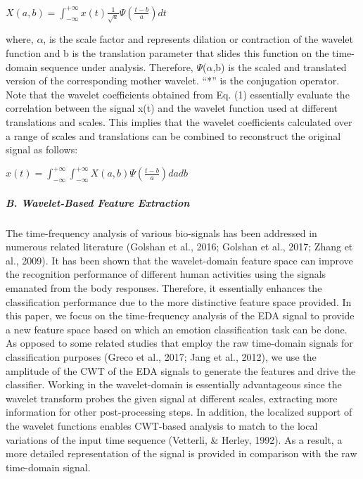 $X(a,b) = \int_{-\infty}^{+\infty}x(t)\frac{1}{\sqrt{a}} \Psi (\frac{t-b}{a}) dt$\newline

where, $\alpha$, is the scale factor and represents dilation or contraction of the wavelet 
function and b is the translation parameter that slides this function on the 
time-domain sequence under analysis. Therefore, $\Psi$($\alpha$,b) is the scaled and translated 
version of the corresponding mother wavelet. “*” is the conjugation operator.
Note that the wavelet coefficients obtained from Eq. (1) essentially evaluate the 
correlation between the signal x(t) and the wavelet function used at different 
translations and scales. This implies that the wavelet coefficients calculated 
over a range of scales and translations can be combined to reconstruct the original 
signal as follows:

$x(t) = \int_{-\infty}^{+\infty} \int_{-\infty}^{+\infty} X(a,b) \Psi (\frac{t-b}{a}) dadb$\newline

\subparagraph{B. Wavelet-Based Feature Extraction}
The time-frequency analysis of various bio-signals has been addressed in numerous 
related literature (Golshan et al., 2016; Golshan et al., 2017; Zhang et al., 2009). 
It has been shown that the wavelet-domain feature space can improve the recognition 
performance of different human activities using the signals emanated from the body 
responses. Therefore, it essentially enhances the classification performance due to 
the more distinctive feature space provided. 
In this paper, we focus on the time-frequency analysis of the EDA signal to provide 
a new feature space based on which an emotion classification task can be done. As 
opposed to some related studies that employ the raw time-domain signals for 
classification purposes (Greco et al., 2017; Jang et al., 2012), we use the 
amplitude of the CWT of the EDA signals to generate the features and drive the 
classifier. Working in the wavelet-domain is essentially advantageous since the 
wavelet transform probes the given signal at different scales, extracting more 
information for other post-processing steps. In addition, the localized support 
of the wavelet functions enables CWT-based analysis to match to the local variations 
of the input time sequence (Vetterli, \& Herley, 1992). As a result, a more detailed 
representation of the signal is provided in comparison with the raw time-domain signal.

